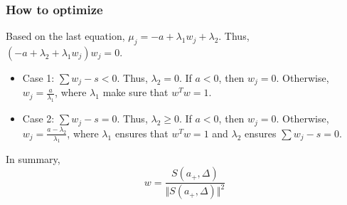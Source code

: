\documentclass{beamer}
\begin{document}
\begin{frame}
\frametitle{How to optimize}
Based on the last equation, $\mu_j = -a + \lambda_1 w_j + \lambda_2$. Thus, $(-a + \lambda_2 + \lambda_1 w_j) w_j = 0$.
\begin{itemize}
 \item Case 1: $\sum w_j -s < 0$. Thus, $\lambda_2 = 0$. If $a < 0$, then $w_j = 0$. Otherwise, $w_j = \frac{a}{\lambda_1}$, where $ \lambda_1 $ make sure that $w^T w = 1$.
 \item Case 2: $\sum w_j -s = 0$. Thus, $\lambda_2 \ge 0$. If $a < 0$, then $w_j = 0$. Otherwise, $w_j = \frac{a - \lambda_2}{\lambda_1}$, where $\lambda_1$ ensures that $w^T w = 1$ and $\lambda_2$ ensures $\sum w_j -s = 0$.
\end{itemize}
In summary,
\begin{equation*}
w = \frac{S(a_{+}, \Delta)}{\Vert S(a_{+},\Delta) \Vert^2}
\end{equation*}
\end{frame}
\end{document}

